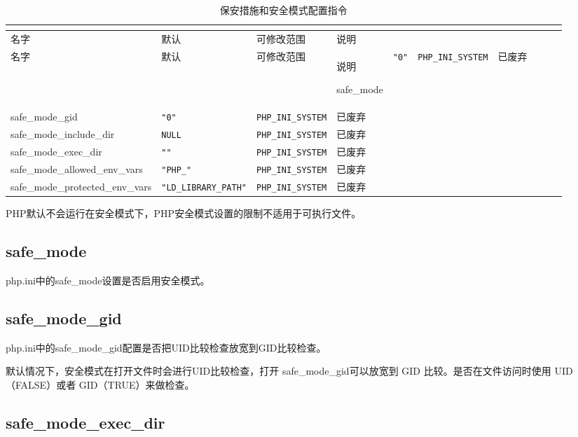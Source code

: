 \begin{longtable}{|m{60pt}|m{40pt}|m{60pt}|m{40pt}|}
\tabularnewline\hline
名字&默认&可修改范围&说明
\endhead

\caption{保安措施和安全模式配置指令}\\
\hline
名字&默认&可修改范围&说明
\endfirsthead

\endfoot

\endlastfoot
\hline
safe\_mode						&\texttt{"0"}					&\texttt{PHP\_INI\_SYSTEM}&已废弃\\
\hline
safe\_mode\_gid					&\texttt{"0"}					&\texttt{PHP\_INI\_SYSTEM}&已废弃\\
\hline
safe\_mode\_include\_dir			&\texttt{NULL}				&\texttt{PHP\_INI\_SYSTEM}&已废弃\\
\hline
safe\_mode\_exec\_dir				&\texttt{""}					&\texttt{PHP\_INI\_SYSTEM}&已废弃\\
\hline	 
safe\_mode\_allowed\_env\_vars		&\texttt{"PHP\_"}				&\texttt{PHP\_INI\_SYSTEM}&已废弃\\
\hline	 
safe\_mode\_protected\_env\_vars	&\texttt{"LD\_LIBRARY\_PATH"}	&\texttt{PHP\_INI\_SYSTEM}&已废弃\\
\hline
\end{longtable}

PHP默认不会运行在安全模式下，PHP安全模式设置的限制不适用于可执行文件。






\subsection{safe\_mode}



php.ini中的safe\_mode设置是否启用安全模式。



\subsection{safe\_mode\_gid}

php.ini中的safe\_mode\_gid配置是否把UID比较检查放宽到GID比较检查。

默认情况下，安全模式在打开文件时会进行UID比较检查，打开 safe\_mode\_gid可以放宽到 GID 比较。是否在文件访问时使用 UID（FALSE）或者 GID（TRUE）来做检查。




\subsection{safe\_mode\_exec\_dir}


